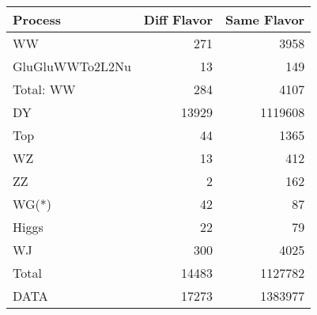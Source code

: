 \begin{table}[ht]
	\centering
\begin{tabular}{lrr}

         Process &  Diff Flavor &  Same Flavor \\
		\hline
              WW &          271 &         3958 \\
 GluGluWWTo2L2Nu &           13 &          149 \\
\hline
       Total: WW &          284 &         4107 \\
              DY &        13929 &      1119608 \\
             Top &           44 &         1365 \\
              WZ &           13 &          412 \\
              ZZ &            2 &          162 \\
           WG(*) &           42 &           87 \\
           Higgs &           22 &           79 \\
              WJ &          300 &         4025 \\
\hline
           Total &        14483 &      1127782 \\
            DATA &        17273 &      1383977 \\


\end{tabular}

\end{table}